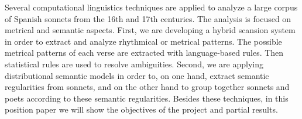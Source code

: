 Several computational linguistics techniques are applied to analyze a large corpus of Spanish sonnets from the 16th and 17th centuries. The analysis is focused on metrical and semantic aspects. First, we are developing a hybrid scansion system in order to extract and analyze rhythmical or metrical patterns. The possible metrical patterns of each verse are extracted with language-based rules. Then statistical rules are used to resolve ambiguities. Second, we are applying distributional semantic models in order to, on one hand, extract semantic regularities from sonnets, and on the other hand to group together sonnets and poets according to these semantic regularities. Besides these techniques, in this position paper we will show the objectives of the project and partial results.
